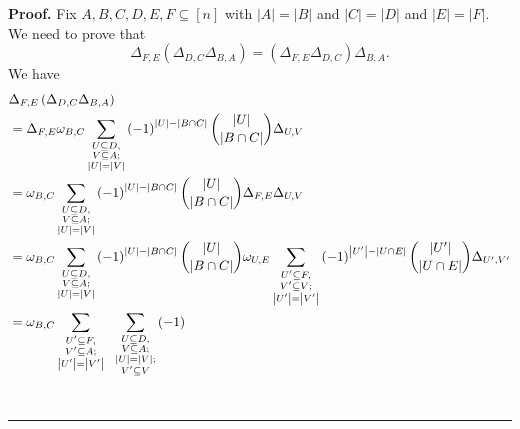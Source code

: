 \documentclass[numbers=enddot,12pt,final,onecolumn,notitlepage]{scrartcl}%
\numberwithin{exer}{subsection}
\theoremstyle{definition}
\newenvironment{proof}[1][Proof]{\noindent\textbf{#1.} }{\ \rule{0.5em}{0.5em}}
\let\sumnonlimits\sum
\renewcommand{\sum}{\sumnonlimits\limits}
\newenvironment{noncompile}{}{}
\begin{document}
\begin{noncompile}
\begin{proof}
Fix $A,B,C,D,E,F\subseteq\left[  n\right]  $ with $\left\vert A\right\vert
=\left\vert B\right\vert $ and $\left\vert C\right\vert =\left\vert
D\right\vert $ and $\left\vert E\right\vert =\left\vert F\right\vert $. We
need to prove that
\[
\Delta_{F,E}\left(  \Delta_{D,C}\Delta_{B,A}\right)  =\left(  \Delta
_{F,E}\Delta_{D,C}\right)  \Delta_{B,A}.
\]
We have%
\begin{align*}
&  \Delta_{F,E}\left(  \Delta_{D,C}\Delta_{B,A}\right) \\
&  =\Delta_{F,E}\omega_{B,C}\sum_{\substack{U\subseteq D,\\V\subseteq
A;\\\left\vert U\right\vert =\left\vert V\right\vert }}\left(  -1\right)
^{\left\vert U\right\vert -\left\vert B\cap C\right\vert }\dbinom{\left\vert
U\right\vert }{\left\vert B\cap C\right\vert }\Delta_{U,V}\\
&  =\omega_{B,C}\sum_{\substack{U\subseteq D,\\V\subseteq A;\\\left\vert
U\right\vert =\left\vert V\right\vert }}\left(  -1\right)  ^{\left\vert
U\right\vert -\left\vert B\cap C\right\vert }\dbinom{\left\vert U\right\vert
}{\left\vert B\cap C\right\vert }\Delta_{F,E}\Delta_{U,V}\\
&  =\omega_{B,C}\sum_{\substack{U\subseteq D,\\V\subseteq A;\\\left\vert
U\right\vert =\left\vert V\right\vert }}\left(  -1\right)  ^{\left\vert
U\right\vert -\left\vert B\cap C\right\vert }\dbinom{\left\vert U\right\vert
}{\left\vert B\cap C\right\vert }\omega_{U,E}\sum_{\substack{U^{\prime
}\subseteq F,\\V^{\prime}\subseteq V;\\\left\vert U^{\prime}\right\vert
=\left\vert V^{\prime}\right\vert }}\left(  -1\right)  ^{\left\vert U^{\prime
}\right\vert -\left\vert U\cap E\right\vert }\dbinom{\left\vert U^{\prime
}\right\vert }{\left\vert U\cap E\right\vert }\Delta_{U^{\prime},V^{\prime}}\\
&  =\omega_{B,C}\sum_{\substack{U^{\prime}\subseteq F,\\V^{\prime}\subseteq
A;\\\left\vert U^{\prime}\right\vert =\left\vert V^{\prime}\right\vert
}}\ \ \sum_{\substack{U\subseteq D,\\V\subseteq A;\\\left\vert U\right\vert
=\left\vert V\right\vert ;\\V^{\prime}\subseteq V}}\left(  -1\right)

\end{align*}
\end{proof}
\end{noncompile}
\end{document}
